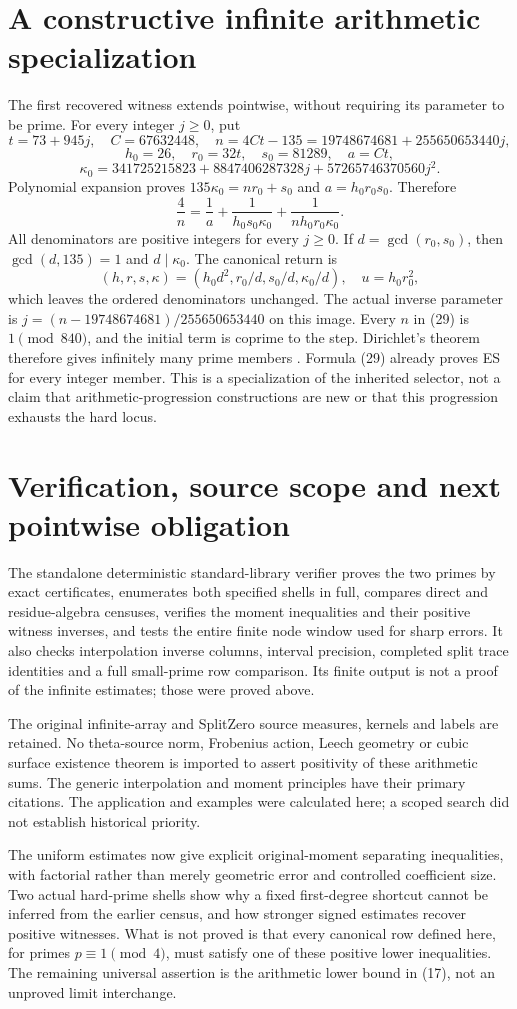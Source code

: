 \section{A constructive infinite arithmetic specialization}
The first recovered witness extends pointwise, without requiring its parameter
to be prime. For every integer $j\ge0$, put
\[
 t=73+945j,\quad C=67632448,\quad n=4Ct-135
 =19748674681+255650653440j,
\]
\[
 h_0=26,\quad r_0=32t,\quad s_0=81289,\quad a=Ct,
\]
\[
 \kappa_0=341725215823+8847406287328j+57265746370560j^2.
\]
Polynomial expansion proves $135\kappa_0=nr_0+s_0$ and
$a=h_0r_0s_0$. Therefore
\[
 \boxed{\frac4n=\frac1a+\frac1{h_0s_0\kappa_0}
                  +\frac1{nh_0r_0\kappa_0}.}\tag{29}
\]
All denominators are positive integers for every $j\ge0$.
If $d=\gcd(r_0,s_0)$, then $\gcd(d,135)=1$ and $d\mid\kappa_0$.
The canonical return is
\[
 (h,r,s,\kappa)=(h_0d^2,r_0/d,s_0/d,\kappa_0/d),\quad
 u=h_0r_0^2,
\]
which leaves the ordered denominators unchanged. The actual inverse parameter
is $j=(n-19748674681)/255650653440$ on this image.
Every $n$ in (29) is $1\pmod{840}$, and the initial term is coprime to the
step. Dirichlet's theorem therefore gives infinitely many prime members
\cite[Theorem 18.1]{Dirichlet}. Formula (29) already proves ES for every integer
member. This is a specialization of the inherited selector, not a claim that
arithmetic-progression constructions are new or that this progression exhausts
the hard locus.

\section{Verification, source scope and next pointwise obligation}
The standalone deterministic standard-library verifier proves the two primes by exact
certificates, enumerates both specified shells in full, compares direct and
residue-algebra censuses, verifies the moment inequalities and their positive
witness inverses, and tests the entire finite node window used for sharp errors.
It also checks interpolation inverse columns, interval precision, completed
split trace identities and a full small-prime row comparison. Its finite output
is not a proof of the infinite estimates; those were proved above.

The original infinite-array and SplitZero source measures, kernels and labels
are retained. No theta-source norm, Frobenius action, Leech geometry or cubic
surface existence theorem is imported to assert positivity of these arithmetic
sums. The generic interpolation and moment principles have their primary
citations. The application and examples were calculated here; a scoped search
did not establish historical priority.

The uniform estimates now give explicit original-moment separating inequalities,
with factorial rather than merely geometric error and controlled coefficient
size. Two actual hard-prime shells show why a fixed first-degree shortcut cannot
be inferred from the earlier census, and how stronger signed estimates recover
positive witnesses. What is not proved is that every canonical row defined here,
for primes $p\equiv1\pmod4$, must satisfy one
of these positive lower inequalities. The remaining universal assertion is the
arithmetic lower bound in (17), not an unproved limit interchange.
